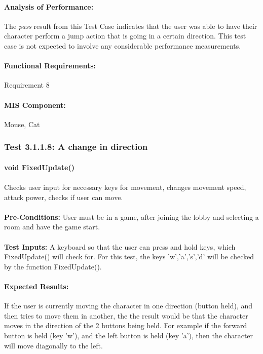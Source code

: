 \documentclass{article}
\begin{document}
    \paragraph{Analysis of Performance:} The \emph{pass} result from this Test Case indicates that the user was able to have their character perform a jump action that is going in a certain direction. This test case is not expected to involve any considerable performance measurements.
    \paragraph{Functional Requirements:} Requirement 8
    \paragraph{MIS Component:} Mouse, Cat 
    
    \subsubsection{Test 3.1.1.8: A change in direction}
    \paragraph{}\textbf{void FixedUpdate()}
    \paragraph{} Checks user input for necessary keys for movement, changes movement speed, attack power, checks if user can move.
    \paragraph{}\textbf{Pre-Conditions:} User must be in a game, after joining the lobby and selecting a room and have the game start.
    \paragraph{}\textbf{Test Inputs:} A keyboard so that the user can press and hold keys, which FixedUpdate() will check for. For this test, the keys 'w','a','s','d' will be checked by the function FixedUpdate(). 
    \paragraph{Expected Results:} If the user is currently moving the character in one direction (button held), and then tries to move them in another, the the result would be that the character moves in the direction of the 2 buttons being held. For example if the forward button is held (key 'w'), and the left button is held (key 'a'), then the character will move diagonally to the left.  
\end{document}
